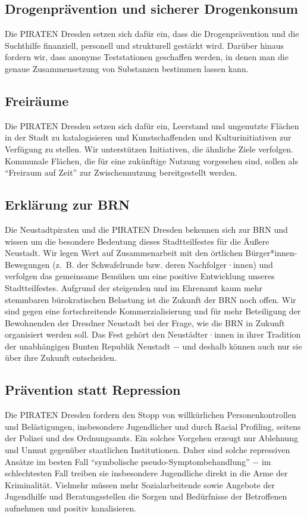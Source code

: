 \documentclass[a4paper, 11pt]{article}
\begin{document}
\subsection{Drogenprävention und sicherer Drogenkonsum}
Die PIRATEN Dresden setzen sich dafür ein, dass die Drogenprävention und die Suchthilfe finanziell, personell und strukturell gestärkt wird. Darüber hinaus fordern wir, dass anonyme Teststationen geschaffen werden, in denen man die genaue Zusammensetzung von Substanzen bestimmen lassen kann.


\subsection{Freiräume}
Die PIRATEN Dresden setzen sich dafür ein, Leerstand und ungenutzte Flächen in der Stadt zu katalogisieren und Kunstschaffenden und Kulturinitiativen zur Verfügung zu stellen. Wir unterstützen Initiativen, die ähnliche Ziele verfolgen. Kommunale Flächen, die für eine zukünftige Nutzung vorgesehen sind, sollen als ``Freiraum auf Zeit'' zur Zwischennutzung bereitgestellt werden.


\subsection{Erklärung zur BRN}
Die Neustadtpiraten und die PIRATEN Dresden bekennen sich zur BRN und wissen um die besondere Bedeutung dieses Stadtteilfestes für die Äußere Neustadt. Wir legen Wert auf Zusammenarbeit mit den örtlichen Bürger*innen-Bewegungen (z. B. der Schwafelrunde bzw. deren Nachfolger·innen) und verfolgen das gemeinsame Bemühen um eine positive Entwicklung unseres Stadtteilfestes. Aufgrund der steigenden und im Ehrenamt kaum mehr stemmbaren bürokratischen Belastung ist die Zukunft der BRN noch offen. Wir sind gegen eine fortschreitende Kommerzialisierung und für mehr Beteiligung der Bewohnenden der Dresdner Neustadt bei der Frage, wie die BRN in Zukunft organisiert werden soll. Das Fest gehört den Neustädter·innen in ihrer Tradition der unabhängigen Bunten Republik Neustadt $-$ und deshalb können auch nur sie über ihre Zukunft entscheiden.



\subsection{Prävention statt Repression}
Die PIRATEN Dresden fordern den Stopp von willkürlichen Personenkontrollen und Belästigungen, insbesondere Jugendlicher und durch Racial Profiling, seitens der Polizei und des Ordnungsamts. Ein solches Vorgehen erzeugt nur Ablehnung und Unmut gegenüber staatlichen Institutionen. Daher sind solche repressiven Ansätze im besten Fall ``symbolische pseudo-Symptombehandlung'' $-$ im schlechtesten Fall treiben sie insbesondere Jugendliche direkt in die Arme der Kriminalität. Vielmehr müssen mehr Sozialarbeitende sowie Angebote der Jugendhilfe und Beratungsstellen die Sorgen und Bedürfnisse der Betroffenen aufnehmen und positiv kanalisieren.
\end{document}
